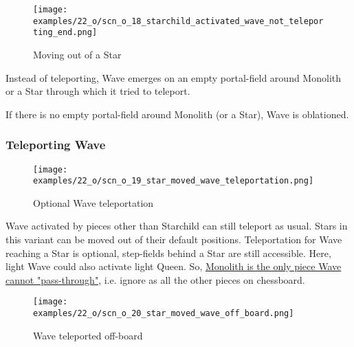 \vspace*{5.7\baselineskip}
\noindent
\begin{wrapfigure}[7]{l}{0.4\textwidth}
\centering
\texttt{[image: examples/22\_o/scn\_o\_18\_starchild\_activated\_wave\_not\_teleporting\_end.png]}
\vspace*{-0.4\baselineskip}
\caption{Moving out of a Star}
\label{fig:scn_o_18_starchild_activated_wave_not_teleporting_end}
\end{wrapfigure}
Instead of teleporting, Wave emerges on an empty portal-field around Monolith or a
Star through which it tried to teleport.

If there is no empty portal-field around Monolith (or a Star), Wave is oblationed.

\clearpage %

\subsubsection*{Teleporting Wave}
\label{sec:One/Starchild/Activating Wave/Teleporting Wave}

\vspace*{-0.9\baselineskip}
\noindent
\begin{figure}[!h]
\texttt{[image: examples/22\_o/scn\_o\_19\_star\_moved\_wave\_teleportation.png]}
\caption{Optional Wave teleportation}
\label{fig:scn_o_19_star_moved_wave_teleportation}
\end{figure}

\vspace*{-0.3\baselineskip}
Wave activated by pieces other than Starchild can still teleport as usual. Stars
in this variant can be moved out of their default positions. Teleportation for
Wave reaching a Star is optional, step-fields behind a Star are still accessible.
Here, light Wave could also activate light Queen. So,
\hyperref[fig:scn_d_10_teleport_wave_via_monolith]{Monolith is the only piece Wave cannot "pass-through"},
i.e. ignore as all the other pieces on chessboard.

\clearpage %

\vspace*{-2.1\baselineskip}
\noindent
\begin{figure}[!h]
\texttt{[image: examples/22\_o/scn\_o\_20\_star\_moved\_wave\_off\_board.png]}
\caption{Wave teleported off-board}
\label{fig:scn_o_20_star_moved_wave_off_board}
\end{figure}

